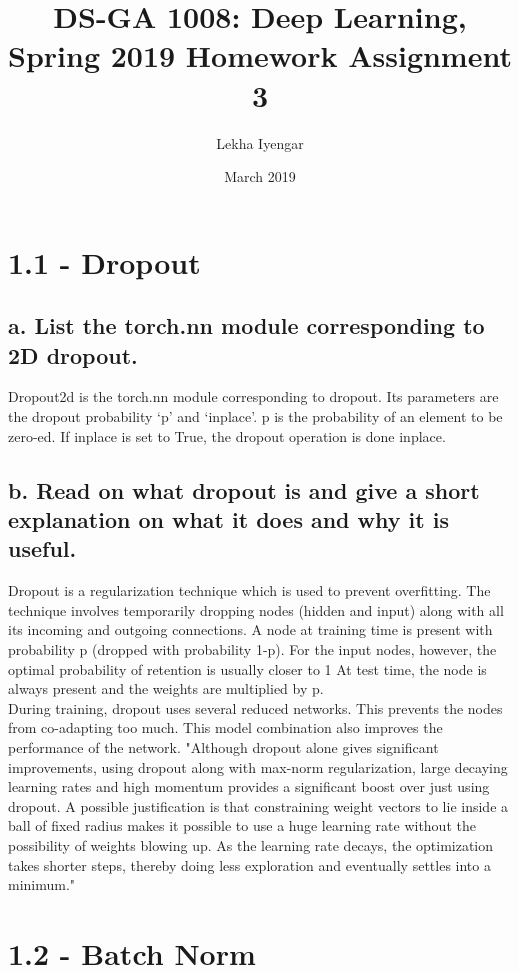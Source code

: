 \documentclass{article}
\title{DS-GA 1008: Deep Learning, Spring 2019
Homework Assignment 3}
\author{Lekha Iyengar}
\date{March 2019}
\begin{document}
\maketitle

\section*{1.1 - Dropout}

\subsection*{a. List the torch.nn module corresponding to 2D dropout.
}

Dropout2d is the torch.nn module corresponding to dropout. Its parameters are the dropout probability ‘p’ and ‘inplace’.
p is the probability of an element to be zero-ed.
If inplace is set to True, the dropout operation is done inplace.

\subsection*{b. Read on what dropout is and give a short explanation on what it does and why
it is useful.}
Dropout is a regularization technique which is used to prevent overfitting. The technique involves temporarily dropping nodes (hidden and input) along with all its incoming and outgoing connections. A node at training time is present with probability p (dropped with probability 1-p). For the input nodes, however, the optimal probability of retention is usually closer to 1 At test time, the node is always present and the weights are multiplied by p.\\
During training, dropout uses several reduced networks. This prevents the nodes from co-adapting too much. This model combination also improves the performance of the network. "Although dropout alone gives significant improvements, using dropout along with max-norm regularization, large decaying learning rates and high momentum provides a significant boost over just using dropout. A possible justification is that constraining weight vectors to lie inside a ball of fixed radius makes it possible to use a huge learning rate without the possibility of weights blowing up. As the learning rate decays, the optimization takes shorter steps, thereby doing less exploration and eventually settles into a minimum."
 \citep{Dropout}

\section*{1.2 - Batch Norm}
\end{document}
